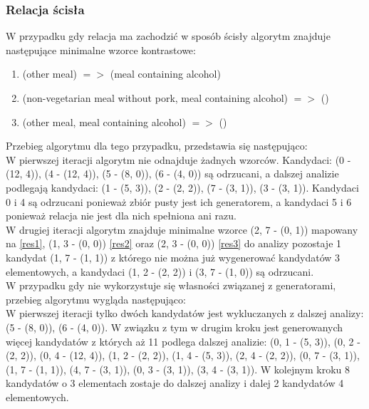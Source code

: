 \documentclass[a4paper,12pt]{article}
\begin{document}
\subsubsection{Relacja ścisła}

W przypadku gdy relacja ma zachodzić w sposób ścisły algorytm znajduje następujące minimalne wzorce kontrastowe:

\begin{enumerate}
\item (other meal) $=>$ (meal containing alcohol) \label{res1}
\item (non-vegetarian meal without pork, meal containing alcohol) $=>$ () \label{res2}
\item (other meal, meal containing alcohol) $=>$ () \label{res3}
\end{enumerate}

Przebieg algorytmu dla tego przypadku, przedstawia się następująco:\\

W pierwszej iteracji algorytm nie odnajduje żadnych wzorców. Kandydaci: (0 - (12, 4)), (4 - (12, 4)), (5 - (8, 0)), (6 - (4, 0)) są odrzucani,
a dalszej analizie podlegają kandydaci: (1 - (5, 3)), (2 - (2, 2)), (7 - (3, 1)), (3 - (3, 1)). Kandydaci 0 i 4 są odrzucani ponieważ zbiór pusty jest ich generatorem, a kandydaci 5 i 6 ponieważ relacja nie jest dla nich spełniona ani razu.\\

W drugiej iteracji algorytm znajduje minimalne wzorce (2, 7 - (0, 1)) mapowany na \ref{res1}, (1, 3 - (0, 0)) \ref{res2} oraz (2, 3 - (0, 0)) \ref{res3} do analizy pozostaje 1 kandydat (1, 7 - (1, 1)) z którego nie można już wygenerować kandydatów 3 elementowych, a kandydaci (1, 2 - (2, 2)) i (3, 7 - (1, 0)) są odrzucani.\\

W przypadku gdy nie wykorzystuje się własności związanej z generatorami, przebieg algorytmu wygląda następująco:\\

W pierwszej iteracji tylko dwóch kandydatów jest wykluczanych z dalszej analizy: (5 - (8, 0)), (6 - (4, 0)). W związku z tym w drugim kroku jest generowanych więcej kandydatów z których aż 11 podlega dalszej analizie: (0, 1 - (5, 3)), (0, 2 - (2, 2)), (0, 4 - (12, 4)), (1, 2 - (2, 2)), (1, 4 - (5, 3)), (2, 4 - (2, 2)), (0, 7 - (3, 1)), (1, 7 - (1, 1)), (4, 7 - (3, 1)), (0, 3 - (3, 1)), (3, 4 - (3, 1)). W kolejnym kroku 8 kandydatów o 3 elementach zostaje do dalszej analizy i dalej 2 kandydatów 4 elementowych.
\end{document}

